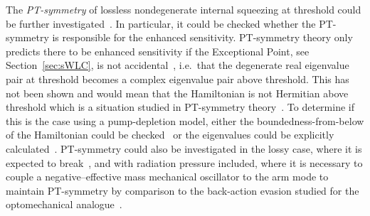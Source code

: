 The \emph{PT-symmetry} of lossless nondegenerate internal squeezing at threshold could be further investigated~\cite{CMBPersonalCommunication}. In particular, it could be checked whether the PT-symmetry is responsible for the enhanced sensitivity.
PT-symmetry theory only predicts there to be enhanced sensitivity if the Exceptional Point, see Section~\ref{sec:sWLC}, is not accidental~\cite{}, i.e.\ that the degenerate real eigenvalue pair at threshold becomes a complex eigenvalue pair above threshold. This has not been shown and would mean that the Hamiltonian is not Hermitian above threshold which is a situation studied in PT-symmetry theory~\cite{}. To determine if this is the case using a pump-depletion model, either the boundedness-from-below of the Hamiltonian could be checked~\cite{} or the eigenvalues could be explicitly calculated~\cite{}.
PT-symmetry could also be investigated in the lossy case, where it is expected to break~\cite{}, and with radiation pressure included, where it is necessary to couple a negative--effective mass mechanical oscillator to the arm mode to maintain PT-symmetry by comparison to the back-action evasion studied for the optomechanical analogue~\cite{liBroadbandSensitivityImprovement2020}.


